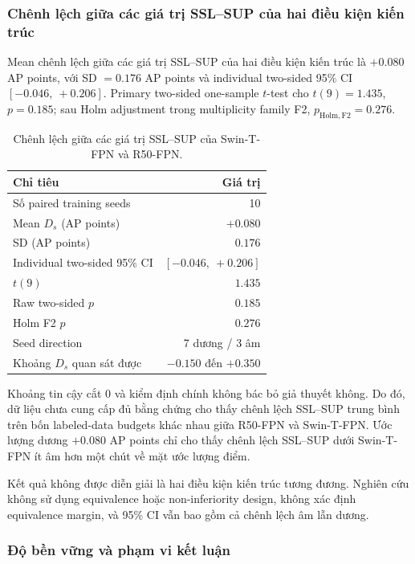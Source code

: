 \documentclass[pdflatex,sn-mathphys-num]{sn-jnl}%
\theoremstyle{thmstyleone}%
\theoremstyle{thmstyletwo}%
\theoremstyle{thmstylethree}%
\begin{document}
\subsubsection{Chênh lệch giữa các giá trị SSL--SUP của hai điều kiện kiến trúc}

Mean chênh lệch giữa các giá trị SSL--SUP của hai điều kiện kiến trúc là $+0.080$ AP points, với SD $=0.176$ AP points và individual two-sided 95\% CI $[-0.046,\ +0.206]$. Primary two-sided one-sample $t$-test cho $t(9)=1.435$, $p=0.185$; sau Holm adjustment trong multiplicity family F2, $p_{\mathrm{Holm,F2}}=0.276$.

\begin{table}[htbp]
\centering
\caption{Chênh lệch giữa các giá trị SSL--SUP của Swin-T-FPN và R50-FPN.}
\label{tab:sq3_primary}
\small
\begin{tabular}{lr}
\toprule
\textbf{Chỉ tiêu} & \textbf{Giá trị}\\
\midrule
Số paired training seeds & 10\\
Mean $D_s$ (AP points) & $+0.080$\\
SD (AP points) & $0.176$\\
Individual two-sided 95\% CI & $[-0.046,\ +0.206]$\\
$t(9)$ & $1.435$\\
Raw two-sided $p$ & $0.185$\\
Holm F2 $p$ & $0.276$\\
Seed direction & 7 dương / 3 âm\\
Khoảng $D_s$ quan sát được & $-0.150$ đến $+0.350$\\
\bottomrule
\end{tabular}
\end{table}

Khoảng tin cậy cắt 0 và kiểm định chính không bác bỏ giả thuyết không. Do đó, dữ liệu chưa cung cấp đủ bằng chứng cho thấy chênh lệch SSL--SUP trung bình trên bốn labeled-data budgets khác nhau giữa R50-FPN và Swin-T-FPN. Ước lượng dương $+0.080$ AP points chỉ cho thấy chênh lệch SSL--SUP dưới Swin-T-FPN ít âm hơn một chút về mặt ước lượng điểm.

Kết quả không được diễn giải là hai điều kiện kiến trúc tương đương. Nghiên cứu không sử dụng equivalence hoặc non-inferiority design, không xác định equivalence margin, và 95\% CI vẫn bao gồm cả chênh lệch âm lẫn dương.

\subsubsection{Độ bền vững và phạm vi kết luận}
\end{document}
